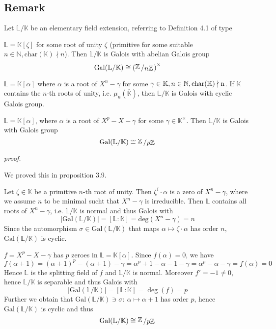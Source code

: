 \documentclass[12pt]{book}
\newcommand{\slant}[2]{{\raisebox{.1em}{$#1$}\left/\raisebox{-.1em}{$#2$}\right.}}
\begin{document}
\begin{spacing}{1.3}
\subsection{Remark} %
Let $\mathbb{L}/\mathbb{K}$ be an elementary field extension, referring to Definition 4.1 of type
\begin{compactenum}
\item $\mathbb{L}=\mathbb{K}[\zeta]$ for some root of unity $\zeta$ (primitive for some suitable $n \in \mathbb{N}, \textrm{char}(\mathbb{K}) \nmid n$). Then $\mathbb{L}/\mathbb{K}$ is Galois with abelian Galois group $$\rm{Gal}(\mathbb{L}/\mathbb{K}) \cong \left(\slant{\mathbb{Z}}{n \mathbb{Z}}\right)^{\times}$$
\item $\mathbb{L}=\mathbb{K}[\alpha]$ where $\alpha$ is a root of $X^n-\gamma$ for some $\gamma \in \mathbb{K}, n \in \mathbb{N}, \rm{char}(\mathbb{K}) \nmid n$. If $\mathbb{K}$ contains the $n$-th roots of unity, i.e. $\mu_n(\overline{\mathbb{K}})$, then $\mathbb{L}/\mathbb{K}$ is Galois with cyclic Galois group.
\item $\mathbb{L}=\mathbb{K}[\alpha]$, where $\alpha$ is a root of $X^p-X-\gamma$ for some $\gamma \in \mathbb{K}^{\times}$. Then $\mathbb{L}/\mathbb{K}$ is Galois with Galois group $$\rm{Gal}(\mathbb{L}/\mathbb{K}) \cong \slant{\mathbb{Z}}{p \mathbb{Z}}$$
\end{compactenum}
\textit{proof.}
\begin{compactenum}
\item We proved this in proposition 3.9.
\item Let $\zeta \in \mathbb{K}$ be a primitive $n$-th root of unity. Then $\zeta^{i} \cdot \alpha$ is a zero of $X^n-\gamma$, where we assume $n$ to be minimal sucht that $X^n-\gamma$ is irreducible. Then $\mathbb{L}$ contains all roots of $X^n-\gamma$, i.e. $\mathbb{L}/\mathbb{K}$ is normal and thus Galois with $$ \vert \textrm{Gal}(\mathbb{L}/\mathbb{K}) \vert = [\mathbb{L}:\mathbb{K}]=\textrm{deg}(X^n-\gamma)=n$$ Since the automorphism $\sigma \in \textrm{Gal}(\mathbb{L}/\mathbb{K})$ that maps $\alpha \mapsto \zeta \cdot \alpha$ has order $n$, $\textrm{Gal}(\mathbb{L}/\mathbb{K})$ is cyclic.
\item $f=X^p-X-\gamma$ has $p$ zeroes in $\mathbb{L}=\mathbb{K}[\alpha]$. Since 
$f(\alpha)=0$, we have $$f(\alpha+1)=\left(\alpha+1\right)^p-\left(\alpha+1\right)-\gamma=\alpha^p+1-\alpha-1-\gamma=\alpha^p-\alpha-\gamma =f(\alpha)=0$$
Hence $\mathbb{L}$ is the splitting field of $f$ and $\mathbb{L}/\mathbb{K}$ is normal. Moreover $f'=-1 \neq 0$, hence $\mathbb{L}/\mathbb{K}$ is separable and thus Galois with $$\vert \textrm{Gal}(\mathbb{L}/\mathbb{K}) \vert = [\mathbb{L}:\mathbb{K}]=\deg(f)=p$$
Further we obtain that $\textrm{Gal}(\mathbb{L}/\mathbb{K})\ni \sigma: \ \alpha \mapsto \alpha +1$ has order $p$, hence $\textrm{Gal}(\mathbb{L}/\mathbb{K})$ is cyclic and thus $$\textrm{Gal}(\mathbb{L}/\mathbb{K}) \cong \slant{\mathbb{Z}}{p \mathbb{Z}}$$
\end{compactenum}


\end{spacing}
\end{document}
